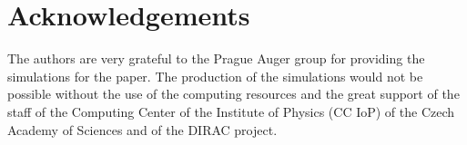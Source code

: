 \documentclass[11pt,a4paper]{article}
\begin{document}
\section*{Acknowledgements}
The authors are very grateful to the Prague Auger group for providing the simulations for the paper. The production of the simulations would not be possible without the use of the computing resources and the great support of the staff of the Computing Center of the Institute of Physics (CC IoP) of the Czech Academy of Sciences and of the DIRAC project.

\newpage


\end{document}
